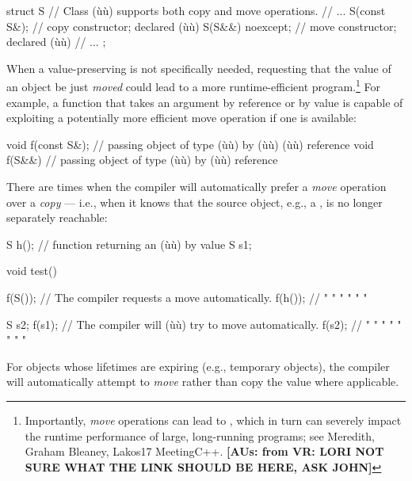 \begin{emcppslisting}
struct S  // Class (ù{}ù) supports both copy and move operations.
{
   // ...
   S(const S&);      // copy constructor; declared (ù{}ù)
   S(S&&) noexcept;  // move constructor; declared (ù{}ù)
   // ...
};
\end{emcppslisting}
    

\noindent When a value-preserving  is not specifically
needed, requesting that the value of an object be just \emph{moved}
could lead to a more runtime-efficient program.{\cprotect\footnote{Importantly,
\emph{move} operations can lead to , which in
turn can severely impact the runtime performance of large,
long-running programs; see Meredith, Graham Bleaney, Lakos17
  MeetingC++. \textbf{[AUs: from VR: LORI NOT SURE WHAT THE LINK SHOULD BE HERE, ASK JOHN]}}} For example, a function that takes an argument by 
reference or by value is capable of exploiting a potentially more
efficient move operation if one is available:

\begin{emcppslisting}
void f(const S&);  // passing object of type (ù{}ù) by (ù{}ù) (ù{}ù) reference
void f(S&&)        // passing object of type (ù{}ù) by (ù{}ù) reference
\end{emcppslisting}
    

\noindent There are times when the compiler will automatically prefer a
\emph{move} operation over a \emph{copy} --- i.e., when it knows that
the source object, e.g., a , is no longer separately
reachable:

\begin{emcppslisting}
S h();  // function returning an (ù{}ù) by value
S s1;

void test()
{
    f(S());  // The compiler requests a move automatically.
    f(h());  //  "     "         "    "    "         "

    S s2;
    f(s1);   // The compiler will (ù{}ù) try to move automatically.
    f(s2);   //  "      "      "   "   "   "    "         "
}
\end{emcppslisting}
    

\noindent For objects whose lifetimes are expiring (e.g., temporary objects), the
compiler will automatically attempt to \emph{move} rather than copy the
value where applicable.

